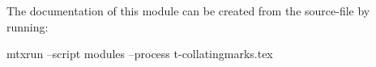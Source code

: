 The documentation of this module can be created from the source-file by running:

mtxrun --script modules --process t-collatingmarks.tex